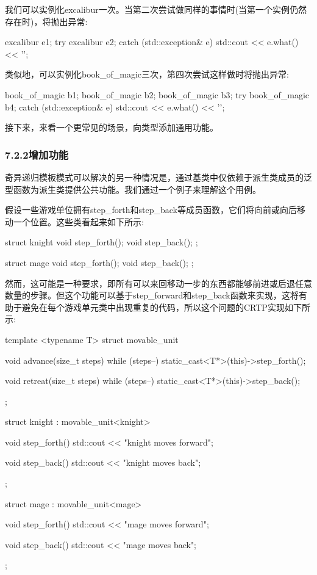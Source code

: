 我们可以实例化excalibur一次。当第二次尝试做同样的事情时(当第一个实例仍然存在时)，将抛出异常:

\begin{cpp}
excalibur e1;
try
{
	excalibur e2;
}
catch (std::exception& e)
{
	std::cout << e.what() << '\n';
}
\end{cpp}

类似地，可以实例化book\_of\_magic三次，第四次尝试这样做时将抛出异常:

\begin{cpp}
book_of_magic b1;
book_of_magic b2;
book_of_magic b3;
try
{
	book_of_magic b4;
}
catch (std::exception& e)
{
	std::cout << e.what() << '\n';
}
\end{cpp}

接下来，来看一个更常见的场景，向类型添加通用功能。

\subsubsection{7.2.2\hspace{0.2cm}增加功能}

奇异递归模板模式可以解决的另一种情况是，通过基类中仅依赖于派生类成员的泛型函数为派生类提供公共功能。我们通过一个例子来理解这个用例。

假设一些游戏单位拥有step\_forth和step\_back等成员函数，它们将向前或向后移动一个位置。这些类看起来如下所示:

\begin{cpp}
struct knight
{
	void step_forth();
	void step_back();
};

struct mage
{
	void step_forth();
	void step_back();
};
\end{cpp}

然而，这可能是一种要求，即所有可以来回移动一步的东西都能够前进或后退任意数量的步骤。但这个功能可以基于step\_forward和step\_back函数来实现，这将有助于避免在每个游戏单元类中出现重复的代码，所以这个问题的CRTP实现如下所示:

\begin{cpp}
template <typename T>
struct movable_unit
{
	void advance(size_t steps)
	{
		while (steps--)
			static_cast<T*>(this)->step_forth();
	}

	void retreat(size_t steps)
	{
		while (steps--)
			static_cast<T*>(this)->step_back();
	}
};

struct knight : movable_unit<knight>
{
	void step_forth()
	{ std::cout << "knight moves forward\n"; }
	
	void step_back()
	{ std::cout << "knight moves back\n"; }
};

struct mage : movable_unit<mage>
{
	void step_forth()
	{ std::cout << "mage moves forward\n"; }
	
	void step_back()
	{ std::cout << "mage moves back\n"; }
};
\end{cpp}

